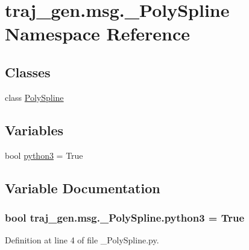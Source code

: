 \hypertarget{namespacetraj__gen_1_1msg_1_1___poly_spline}{}\section{traj\+\_\+gen.\+msg.\+\_\+\+Poly\+Spline Namespace Reference}
\label{namespacetraj__gen_1_1msg_1_1___poly_spline}
\subsection*{Classes}
\begin{DoxyCompactItemize}
\item 
class \hyperlink{classtraj__gen_1_1msg_1_1___poly_spline_1_1_poly_spline}{Poly\+Spline}
\end{DoxyCompactItemize}
\subsection*{Variables}
\begin{DoxyCompactItemize}
\item 
bool \hyperlink{namespacetraj__gen_1_1msg_1_1___poly_spline_a5ff8e68ba879278d6d66b1e6895442f0}{python3} = True
\end{DoxyCompactItemize}


\subsection{Variable Documentation}
\subsubsection[{\texorpdfstring{python3}{python3}}]{\setlength{\rightskip}{0pt plus 5cm}bool traj\+\_\+gen.\+msg.\+\_\+\+Poly\+Spline.\+python3 = True}\hypertarget{namespacetraj__gen_1_1msg_1_1___poly_spline_a5ff8e68ba879278d6d66b1e6895442f0}{}\label{namespacetraj__gen_1_1msg_1_1___poly_spline_a5ff8e68ba879278d6d66b1e6895442f0}


Definition at line 4 of file \+\_\+\+Poly\+Spline.\+py.

